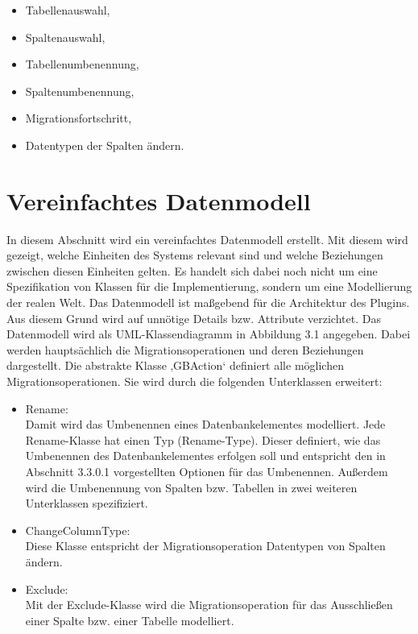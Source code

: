 \begin{itemize}
	\item Tabellenauswahl,
	\item Spaltenauswahl,
	\item Tabellenumbenennung,
	\item Spaltenumbenennung,
	\item Migrationsfortschritt,
	\item Datentypen der Spalten ändern.
\end{itemize}







\section{Vereinfachtes Datenmodell}
In diesem Abschnitt wird ein vereinfachtes Datenmodell erstellt. Mit diesem wird gezeigt, welche Einheiten des Systems relevant sind und welche Beziehungen zwischen diesen Einheiten gelten. Es handelt sich dabei noch nicht um eine Spezifikation von Klassen für die Implementierung, sondern um eine Modellierung der realen Welt. Das Datenmodell ist maßgebend für die Architektur des Plugins. Aus diesem Grund wird auf unnötige Details bzw. Attribute verzichtet. Das Datenmodell wird als UML-Klassendiagramm in Abbildung 3.1 angegeben. Dabei werden hauptsächlich die Migrationsoperationen und deren Beziehungen dargestellt.
Die abstrakte Klasse ‚GBAction‘ definiert alle möglichen Migrationsoperationen. Sie wird durch die folgenden Unterklassen erweitert:
\begin{itemize}
	\item Rename: \\
	Damit wird das Umbenennen eines Datenbankelementes modelliert. Jede Rename-Klasse hat einen Typ (Rename-Type). Dieser definiert, wie das Umbenennen des Datenbankelementes erfolgen soll und entspricht den in Abschnitt 3.3.0.1 vorgestellten Optionen für das Umbenennen. Außerdem wird die Umbenennung von Spalten bzw. Tabellen in zwei weiteren Unterklassen spezifiziert.
	\item ChangeColumnType: \\
	Diese Klasse entspricht der Migrationsoperation \glqq Datentypen von Spalten ändern\grqq.  
	\item Exclude: \\
	Mit der Exclude-Klasse wird die Migrationsoperation für das Ausschließen einer Spalte bzw. einer Tabelle modelliert.
\end{itemize}
